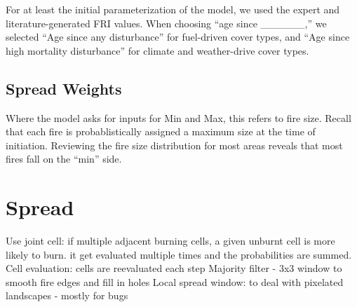 For at least the initial parameterization of the model, we used the expert and literature-generated FRI values. When choosing ``age since \_\_\_\_\_\_,'' we selected ``Age since any disturbance'' for fuel-driven cover types, and ``Age since high mortality disturbance'' for climate and weather-drive cover types.

\subsection{Spread Weights}
Where the model asks for inputs for Min and Max, this refers to fire size. Recall that each fire is probablistically assigned a maximum size at the time of initiation. Reviewing the fire size distribution for most areas reveals that most fires fall on the ``min'' side.

\section{Spread}
Use joint cell: if multiple adjacent burning cells, a given unburnt cell is more likely to burn. it get evaluated multiple times and the probabilities are summed.
Cell evaluation: cells are reevaluated each step
Majority filter - 3x3 window to smooth fire edges and fill in holes
Local spread window: to deal with pixelated landscapes - mostly for bugs


         